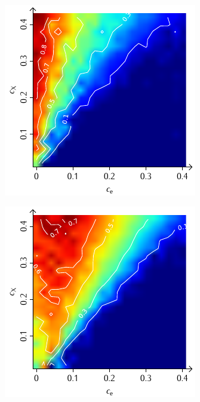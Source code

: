 \documentclass[a4paper, 10pt, twoside, openany]{book} %
\begin{document}
\begin{figure}
\begin{minipage}[t]{0.48\textwidth}
			\includegraphics[width=\textwidth]{Abbildungen/Phasendiagramme/Konturen/F_penalty_cluster_K.pdf}
			\label{F_penalty_cluster_K}
		\end{minipage}
		\begin{minipage}[t]{0.48\textwidth}
			\includegraphics[width=\textwidth]{Abbildungen/Phasendiagramme/Konturen/F_random_K.pdf}

\end{minipage}
\end{figure}
\end{document}
